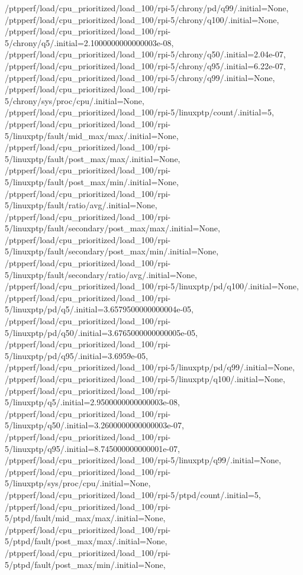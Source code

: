 {    /ptpperf/load/cpu_prioritized/load_100/rpi-5/chrony/pd/q99/.initial=None,
    /ptpperf/load/cpu_prioritized/load_100/rpi-5/chrony/q100/.initial=None,
    /ptpperf/load/cpu_prioritized/load_100/rpi-5/chrony/q5/.initial=2.1000000000000003e-08,
    /ptpperf/load/cpu_prioritized/load_100/rpi-5/chrony/q50/.initial=2.04e-07,
    /ptpperf/load/cpu_prioritized/load_100/rpi-5/chrony/q95/.initial=6.22e-07,
    /ptpperf/load/cpu_prioritized/load_100/rpi-5/chrony/q99/.initial=None,
    /ptpperf/load/cpu_prioritized/load_100/rpi-5/chrony/sys/proc/cpu/.initial=None,
    /ptpperf/load/cpu_prioritized/load_100/rpi-5/linuxptp/count/.initial=5,
    /ptpperf/load/cpu_prioritized/load_100/rpi-5/linuxptp/fault/mid_max/max/.initial=None,
    /ptpperf/load/cpu_prioritized/load_100/rpi-5/linuxptp/fault/post_max/max/.initial=None,
    /ptpperf/load/cpu_prioritized/load_100/rpi-5/linuxptp/fault/post_max/min/.initial=None,
    /ptpperf/load/cpu_prioritized/load_100/rpi-5/linuxptp/fault/ratio/avg/.initial=None,
    /ptpperf/load/cpu_prioritized/load_100/rpi-5/linuxptp/fault/secondary/post_max/max/.initial=None,
    /ptpperf/load/cpu_prioritized/load_100/rpi-5/linuxptp/fault/secondary/post_max/min/.initial=None,
    /ptpperf/load/cpu_prioritized/load_100/rpi-5/linuxptp/fault/secondary/ratio/avg/.initial=None,
    /ptpperf/load/cpu_prioritized/load_100/rpi-5/linuxptp/pd/q100/.initial=None,
    /ptpperf/load/cpu_prioritized/load_100/rpi-5/linuxptp/pd/q5/.initial=3.6579500000000004e-05,
    /ptpperf/load/cpu_prioritized/load_100/rpi-5/linuxptp/pd/q50/.initial=3.6765000000000005e-05,
    /ptpperf/load/cpu_prioritized/load_100/rpi-5/linuxptp/pd/q95/.initial=3.6959e-05,
    /ptpperf/load/cpu_prioritized/load_100/rpi-5/linuxptp/pd/q99/.initial=None,
    /ptpperf/load/cpu_prioritized/load_100/rpi-5/linuxptp/q100/.initial=None,
    /ptpperf/load/cpu_prioritized/load_100/rpi-5/linuxptp/q5/.initial=2.9500000000000003e-08,
    /ptpperf/load/cpu_prioritized/load_100/rpi-5/linuxptp/q50/.initial=3.2600000000000003e-07,
    /ptpperf/load/cpu_prioritized/load_100/rpi-5/linuxptp/q95/.initial=8.745000000000001e-07,
    /ptpperf/load/cpu_prioritized/load_100/rpi-5/linuxptp/q99/.initial=None,
    /ptpperf/load/cpu_prioritized/load_100/rpi-5/linuxptp/sys/proc/cpu/.initial=None,
    /ptpperf/load/cpu_prioritized/load_100/rpi-5/ptpd/count/.initial=5,
    /ptpperf/load/cpu_prioritized/load_100/rpi-5/ptpd/fault/mid_max/max/.initial=None,
    /ptpperf/load/cpu_prioritized/load_100/rpi-5/ptpd/fault/post_max/max/.initial=None,
    /ptpperf/load/cpu_prioritized/load_100/rpi-5/ptpd/fault/post_max/min/.initial=None,
}
